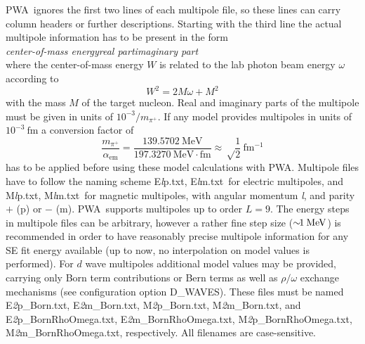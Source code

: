 \documentclass[a4paper,10pt]{article}
\def\PWA{\ttfamily PWA\rmfamily\ }
\def\bl{\phantom{0}}
\def\tt{\ttfamily}
\def\rm{\rmfamily}
\begin{document}
\PWA ignores the first two lines of each multipole file, so these lines can carry column headers or further descriptions.
Starting with the third line the actual multipole information has to be present in the form\\
\tt\textit{center-of-mass energy\bl\bl\bl\bl real part\bl\bl\bl\bl imaginary part}\rm\\
where the center-of-mass energy $W$ is related to the lab photon beam energy $\omega$ according to
\begin{displaymath}
 W^2 = 2M\omega + M^2
\end{displaymath}
with the mass $M$ of the target nucleon. Real and imaginary parts of the multipole must be given in units of
$10^{-3}/m_{\pi^+}$. If any model provides multipoles in units of $10^{-3}\:\mathrm{fm}$ a conversion factor of
\begin{displaymath}
 \frac{m_{\pi^+}}{\alpha_\mathrm{em}} =\frac{139.5702\:\mathrm{MeV}}{197.3270\:\mathrm{MeV\cdot fm}}
\approx \sqrt\frac{1}{2}\:\mathrm{fm^{-1}}
\end{displaymath}
has to be applied before using these model calculations with \tt PWA\rm.
Multipole files have to follow the naming scheme
\tt E\textit{l}p.txt\rm,
\tt E\textit{l}m.txt\rm\ 
for electric multipoles, and
\tt M\textit{l}p.txt\rm,
\tt M\textit{l}m.txt\rm\ 
for magnetic multipoles, with angular momentum \tt\textit{l}\rm, and parity 
$+$ (\tt p\rm) or $-$ (\tt m\rm).
\PWA supports multipoles up to order $L = 9$.
The energy steps in multipole files can be arbitrary, however a rather fine step size ($\sim\hspace{-0.4em}1\:\mathrm{MeV}$)
is recommended in order to have reasonably precise multipole information for any SE fit energy available
(up to now, no interpolation on model values is performed).
For $d$ wave multipoles additional model values may be provided, carrying only Born term contributions or Bern terms as well as 
$\rho/\omega$ exchange mechanisms (see configuration option \tt D\_WAVES\rm).
These files must be named
\tt E\textit{2}p\_Born.txt\rm,
\tt E\textit{2}m\_Born.txt\rm,
\tt M\textit{2}p\_Born.txt\rm,
\tt M\textit{2}m\_Born.txt\rm,
and
\tt E\textit{2}p\_BornRhoOmega.txt\rm,
\tt E\textit{2}m\_BornRhoOmega.txt\rm,
\tt M\textit{2}p\_BornRhoOmega.txt\rm,
\tt M\textit{2}m\_BornRhoOmega.txt\rm,
respectively.
All filenames are case-sensitive.
\end{document}
